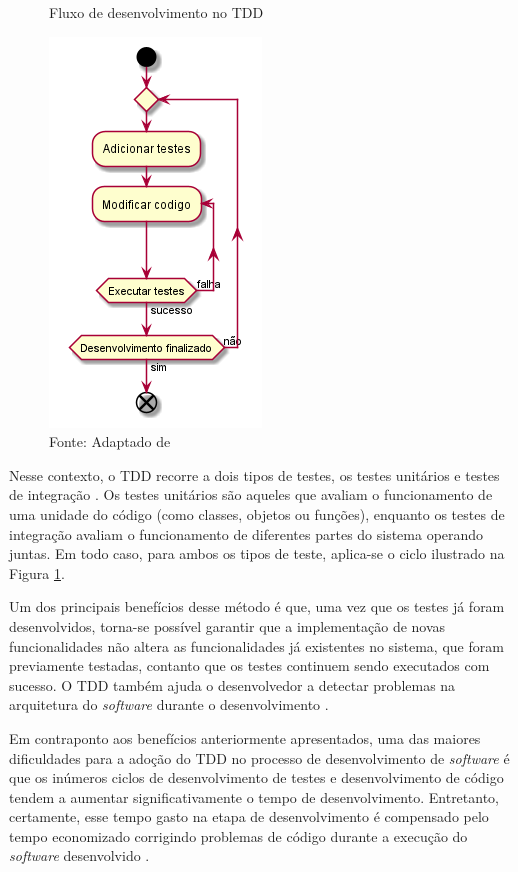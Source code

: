 \begin{figure}[!htb]
  \centering
  \caption{Fluxo de desenvolvimento no TDD}
  \includegraphics[width=.33\textwidth]{../out/diagrams/tdd/tdd.png}
  \smallskip
  \caption*{Fonte: Adaptado de }
  \label{fig:tdd_flow}
\end{figure}

Nesse contexto, o TDD recorre a dois tipos de testes, os testes unitários e
testes de integração \cite{ambler_2006}. Os testes unitários são aqueles que
avaliam o funcionamento de uma unidade do código (como classes, objetos ou
funções), enquanto os testes de integração avaliam o funcionamento de diferentes
partes do sistema operando juntas. Em todo caso, para ambos os tipos de teste,
aplica-se o ciclo ilustrado na Figura \ref{fig:tdd_flow}.

Um dos principais benefícios desse método é que, uma vez que os testes já foram
desenvolvidos, torna-se possível garantir que a implementação de novas
funcionalidades não altera as funcionalidades já existentes no sistema, que
foram previamente testadas, contanto que os testes continuem sendo executados
com sucesso. O TDD também ajuda o desenvolvedor a detectar problemas na
arquitetura do \textit{software} durante o desenvolvimento
\cite{test_driven_2013}.

Em contraponto aos benefícios anteriormente apresentados, uma das maiores
dificuldades para a adoção do TDD no processo de desenvolvimento de
\textit{software} é que os inúmeros ciclos de desenvolvimento de testes e
desenvolvimento de código tendem a aumentar significativamente o tempo de
desenvolvimento. Entretanto, certamente, esse tempo gasto na etapa de
desenvolvimento é compensado pelo tempo economizado corrigindo problemas de
código durante a execução do \textit{software} desenvolvido
\cite{test_driven_2013}.

